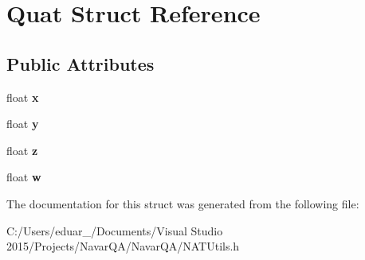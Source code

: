 \hypertarget{struct_quat}{}\section{Quat Struct Reference}
\label{struct_quat}
\subsection*{Public Attributes}
\begin{DoxyCompactItemize}
\item 
float {\bfseries x}\hypertarget{struct_quat_a15db053bd6750a53e33bf30a0250c288}{}\label{struct_quat_a15db053bd6750a53e33bf30a0250c288}

\item 
float {\bfseries y}\hypertarget{struct_quat_ac6045ee4149a978a4ce429c132e46fa2}{}\label{struct_quat_ac6045ee4149a978a4ce429c132e46fa2}

\item 
float {\bfseries z}\hypertarget{struct_quat_a611fbb79f7b802da4f1c65a31c2c5fea}{}\label{struct_quat_a611fbb79f7b802da4f1c65a31c2c5fea}

\item 
float {\bfseries w}\hypertarget{struct_quat_ad3aeee2134443ec0897793834209b0c0}{}\label{struct_quat_ad3aeee2134443ec0897793834209b0c0}

\end{DoxyCompactItemize}


The documentation for this struct was generated from the following file\+:\begin{DoxyCompactItemize}
\item 
C\+:/\+Users/eduar\+\_/\+Documents/\+Visual Studio 2015/\+Projects/\+Navar\+Q\+A/\+Navar\+Q\+A/N\+A\+T\+Utils.\+h\end{DoxyCompactItemize}
